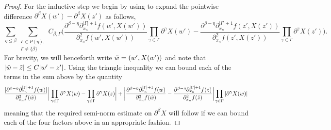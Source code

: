 \documentclass[oneside,hidelinks,indentfirst,10pt]{book}
\begin{document}
\begin{proof}
For the inductive step we begin by using  to expand the pointwise difference \(\partial^\beta X(w')-\partial^\beta X(z')\) as follows,
\[
    \sum_{\eta\leq\beta}\sum_{ \substack{\Gamma\in P(\eta),\\\Gamma\neq \{\beta\}}}C_{\beta,\Gamma}\bigg(\frac{\partial^{\beta-\eta}\partial^{|\Gamma|+1}_{x_n}f(w',X(w'))}{\partial^2_{x_n}f(w',X(w'))}\prod_{\gamma\in\Gamma}\partial^\gamma X(w')-\frac{\partial^{\beta-\eta}\partial^{|\Gamma|+1}_{x_n}f(z',X(z'))}{\partial^2_{x_n}f(z',X(z'))}\prod_{\gamma\in\Gamma}\partial^\gamma X(z')\bigg).
\]
For brevity, we will henceforth write \(\Tilde{w}=(w',X(w'))\) and note that \(|\tilde{w}-\Tilde{z}|\leq C|w'-z'|\). Using the triangle inequality we can bound each of the terms in the sum above by the quantity
\[
    \frac{|\partial^{\beta-\eta}\partial^{|\Gamma|+1}_{x_n}f(\tilde{w})|}{\partial^2_{x_n}f(\tilde{w})}\bigg|\prod_{\gamma\in\Gamma}\partial^\gamma X(w)-\prod_{\gamma\in\Gamma}\partial^\gamma X(z)\bigg|+\bigg|\frac{\partial^{\beta-\eta}\partial^{|\Gamma|+1}_{x_n}f(\tilde{w})}{\partial^2_{x_n}f(\tilde{w})}-\frac{\partial^{\beta-\eta}\partial^{|\Gamma|+1}_{x_n}f(\Tilde{z})}{\partial^2_{x_n}f(\Tilde{z})}\bigg|\prod_{\gamma\in\Gamma}|\partial^\gamma X(w)|
\]
meaning that the required semi-norm estimate on \(\partial^\beta X\) will follow if we can bound each of the four factors above in an appropriate fashion.



\end{proof}
\end{document}
